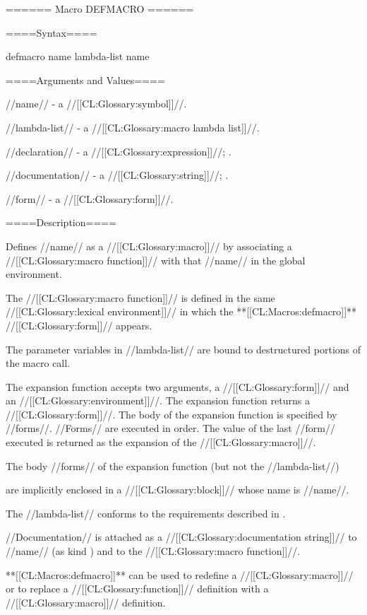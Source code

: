 ====== Macro DEFMACRO ======

====Syntax====

\DefmacWithValuesNewline defmacro {name lambda-list {\DeclsAndDoc} } {name}

====Arguments and Values====

//name// - a //[[CL:Glossary:symbol]]//.


//lambda-list// - a //[[CL:Glossary:macro lambda list]]//.

//declaration// - a  //[[CL:Glossary:expression]]//; \noeval.

//documentation// - a //[[CL:Glossary:string]]//; \noeval.

//form// - a //[[CL:Glossary:form]]//.

====Description====

Defines //name// as a //[[CL:Glossary:macro]]// by associating a //[[CL:Glossary:macro function]]// with that //name// in the global environment.

The //[[CL:Glossary:macro function]]// is defined in the same //[[CL:Glossary:lexical environment]]// in which the **[[CL:Macros:defmacro]]** //[[CL:Glossary:form]]// appears.



The parameter variables in //lambda-list// are bound to destructured portions of the macro call.

The expansion function accepts two arguments, a //[[CL:Glossary:form]]// and an //[[CL:Glossary:environment]]//. The expansion function returns a //[[CL:Glossary:form]]//. The body of the expansion function is specified by //forms//. //Forms// are executed in order. The value of the last //form// executed is returned as the expansion of the //[[CL:Glossary:macro]]//.

The body //forms// of the expansion function (but not the //lambda-list//)

are implicitly enclosed in a //[[CL:Glossary:block]]// whose name is //name//.


The //lambda-list// conforms to the requirements described in \secref\MacroLambdaLists.


//Documentation// is attached as a //[[CL:Glossary:documentation string]]// to //name// (as kind ) and to the //[[CL:Glossary:macro function]]//.



**[[CL:Macros:defmacro]]** can be used to redefine a //[[CL:Glossary:macro]]// or to replace a //[[CL:Glossary:function]]// definition with a //[[CL:Glossary:macro]]// definition.




